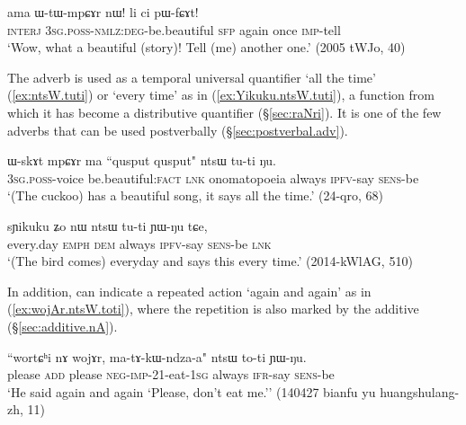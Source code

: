 \begin{exe}
\ex \label{ex:lici.pWfCAt}
\gll ama ɯ-tɯ-mpɕɤr nɯ! li ci pɯ-fɕɤt! \\
\textsc{interj} \textsc{3sg}.\textsc{poss}-\textsc{nmlz}:\textsc{deg}-be.beautiful \textsc{sfp} again once \textsc{imp}-tell \\
\glt `Wow, what a beautiful (story)! Tell (me) another one.' (2005 tWJo, 40)
\end{exe}
 
 The adverb  is used as a temporal universal quantifier `all the time' (\ref{ex:ntsW.tuti}) or `every time' as in (\ref{ex:Yikuku.ntsW.tuti}), a function from which it has become a distributive quantifier (§\ref{sec:raNri}). It is one of the few adverbs that can be used postverbally (§\ref{sec:postverbal.adv}).

\begin{exe}
\ex \label{ex:ntsW.tuti}
\gll  ɯ-skɤt mpɕɤr ma {``qusput qusput"} ntsɯ tu-ti ŋu. \\
\textsc{3sg}.\textsc{poss}-voice be.beautiful:\textsc{fact} \textsc{lnk} onomatopoeia always \textsc{ipfv}-say \textsc{sens}-be \\
\glt `(The cuckoo) has a beautiful song, it says  all the time.' (24-qro, 68)
 \end{exe} 
 
\begin{exe}
\ex \label{ex:Yikuku.ntsW.tuti}
\gll   sɲikuku ʑo nɯ ntsɯ tu-ti ɲɯ-ŋu tɕe, \\
every.day \textsc{emph} \textsc{dem} always \textsc{ipfv}-say \textsc{sens}-be \textsc{lnk} \\
\glt `(The bird comes) everyday and says this every time.'  (2014-kWlAG, 510)
 \end{exe}
 
In addition,  can indicate a repeated action `again and again' as in (\ref{ex:wojAr.ntsW.toti}), where the repetition is also marked by the additive  (§\ref{sec:additive.nA}).

\begin{exe}
\ex \label{ex:wojAr.ntsW.toti}
\gll ``wortɕʰi nɤ wojɤr, ma-tɤ-kɯ-ndza-a" ntsɯ to-ti ɲɯ-ŋu. \\
please \textsc{add} please \textsc{neg}-\textsc{imp}-2\fl{}1-eat-\textsc{1sg} always \textsc{ifr}-say \textsc{sens}-be \\
\glt `He said again and again `Please, don't eat me.'' (140427 bianfu yu huangshulang-zh, 11)
\end{exe}

